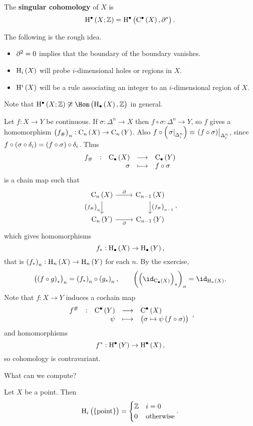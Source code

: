 \begin{definition*}
The \textbf{singular cohomology} of $ X $ is
$$ \H^\bullet\br{X; \ZZ} = \H^\bullet\br{\C^\bullet\br{X}, \da^*}. $$
\end{definition*}

The following is the rough idea.
\begin{itemize}
\item $ \partial^2 = 0 $ implies that the boundary of the boundary vanishes.
\item $ \H_i\br{X} $ will probe $ i $-dimensional holes or regions in $ X $.
\item $ \H^i\br{X} $ will be a rule associating an integer to an $ i $-dimensional region of $ X $.
\end{itemize}
Note that $ \H^\bullet\br{X; \ZZ} \not\cong \Hom\br{\H_\bullet\br{X}, \ZZ} $ in general.


\begin{remark*}
Let $ f : X \to Y $ be continuous. If $ \sigma : \Delta^n \to X $ then $ f \circ \sigma : \Delta^n \to Y $, so $ f $ gives a homomorphism $ \br{f_\#}_n : \C_n\br{X} \to \C_n\br{Y} $. Also $ f \circ \br{\eval{\sigma}_{\Delta_i^n}} \equiv \eval{\br{f \circ \sigma}}_{\Delta_i^n} $, since $ f \circ \br{\sigma \circ \delta_i} = \br{f \circ \sigma} \circ \delta_i $. Thus
$$ \function[f_\#]{\C_\bullet\br{X}}{\C_\bullet\br{Y}}{\sigma}{f \circ \sigma} $$
is a chain map such that
$$
\begin{tikzcd}
\C_n\br{X} \arrow{r}{\da} \arrow{d}[swap]{\br{f_\#}_n} & \C_{n - 1}\br{X} \arrow{d}{\br{f_\#}_{n - 1}} \\
\C_n\br{Y} \arrow{r}[swap]{\da} & \C_{n - 1}\br{Y}
\end{tikzcd},
$$
which gives homomorphisms
$$ f_* : \H_\bullet\br{X} \to \H_\bullet\br{Y}, $$
that is $ \br{f_*}_n : \H_n\br{X} \to \H_n\br{Y} $ for each $ n $. By the exercise,
$$ \br{\br{f \circ g}_*}_n = \br{f_*}_n \circ \br{g_*}_n, \qquad \br{\br{\id_{\C_\bullet\br{X}}}_*}_n = \id_{\H_n\br{X}}. $$
Note that $ f : X \to Y $ induces a cochain map
$$ \function[f^\#]{\C^\bullet\br{Y}}{\C^\bullet\br{X}}{\psi}{\br{\sigma \mapsto \psi\br{f \circ \sigma}}}, $$
and homomorphisms
$$ f^* : \H^\bullet\br{Y} \to \H^\bullet\br{X}, $$
so cohomology is contravariant.
\end{remark*}

\pagebreak

What can we compute?

\begin{lemma}
Let $ X $ be a point. Then
$$ \H_i\br{\pt} =
\begin{cases}
\ZZ & i = 0 \\
0 & \text{otherwise}
\end{cases}.
$$
\end{lemma}

